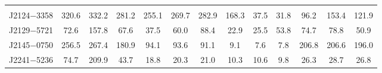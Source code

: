 \begin{landscape}
\begin{table}
\begin{center}
\begin{tabular}{lcccccccccccc}
	               &       &        &         &             &        &        &       &       &         &         &         &         \\     
J2124$-$3358     & 320.6 &  332.2 &  281.2  &   255.1     & 269.7  & 282.9  & 168.3 & 37.5  & 31.8    &  96.2   &  153.4  & 121.9   \\
J2129$-$5721     & 72.6  &  157.8 &  67.6   &   37.5      & 60.0   & 88.4   & 22.9  & 25.5  & 53.8    &  74.7   &  78.8   & 50.9    \\
J2145$-$0750     & 256.5 &  267.4 &  180.9  &   94.1      & 93.6   & 91.1   & 9.1   & 7.6   & 7.8     &  206.8  &  206.6  & 196.0   \\
J2241$-$5236     & 74.7  &  209.9 &  43.7   &   18.8      & 20.3   & 21.0   & 10.3  & 10.6  & 9.8     &  26.3   &  28.7   & 26.8    \\
\hline
\end{tabular}
\end{center}
\end{table}
\end{landscape}

